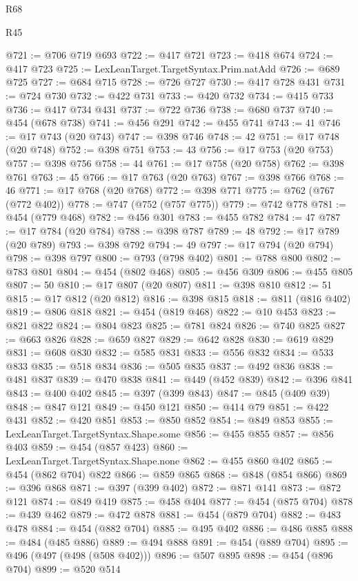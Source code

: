 \begin{lexlean}{R68}
\begin{lexlean}{R45}
\begin{coremodule}
{{{{{{{{{{{{{{{{{{{{{{{{{{{{{{{{{{{{{{{{{{{{{{{{{{{{{{{{{{{{{{{{{{{{{{{{{{{{{{{{{{{{{{{{{{{@721 := @706 @719 @693
@722 := @417 @721
@723 := @418 @674
@724 := @417 @723
@725 := LexLeanTarget.TargetSyntax.Prim.natAdd
@726 := @689 @725
@727 := @684 @715
@728 := @726 @727
@730 := @417 @728 @431
@731 := @724 @730
@732 := @422 @731
@733 := @420 @732
@734 := @415 @733
@736 := @417 @734 @431
@737 := @722 @736
@738 := @680 @737
@740 := @454 (@678 @738)
@741 := @456 @291
@742 := @455 @741
@743 := 41
@746 := @17 @743 (@20 @743)
@747 := @398 @746
@748 := 42
@751 := @17 @748 (@20 @748)
@752 := @398 @751
@753 := 43
@756 := @17 @753 (@20 @753)
@757 := @398 @756
@758 := 44
@761 := @17 @758 (@20 @758)
@762 := @398 @761
@763 := 45
@766 := @17 @763 (@20 @763)
@767 := @398 @766
@768 := 46
@771 := @17 @768 (@20 @768)
@772 := @398 @771
@775 := @762 (@767 (@772 @402))
@778 := @747 (@752 (@757 @775))
@779 := @742 @778
@781 := @454 (@779 @468)
@782 := @456 @301
@783 := @455 @782
@784 := 47
@787 := @17 @784 (@20 @784)
@788 := @398 @787
@789 := 48
@792 := @17 @789 (@20 @789)
@793 := @398 @792
@794 := 49
@797 := @17 @794 (@20 @794)
@798 := @398 @797
@800 := @793 (@798 @402)
@801 := @788 @800
@802 := @783 @801
@804 := @454 (@802 @468)
@805 := @456 @309
@806 := @455 @805
@807 := 50
@810 := @17 @807 (@20 @807)
@811 := @398 @810
@812 := 51
@815 := @17 @812 (@20 @812)
@816 := @398 @815
@818 := @811 (@816 @402)
@819 := @806 @818
@821 := @454 (@819 @468)
@822 := @10 @453
@823 := @821 @822
@824 := @804 @823
@825 := @781 @824
@826 := @740 @825
@827 := @663 @826
@828 := @659 @827
@829 := @642 @828
@830 := @619 @829
@831 := @608 @830
@832 := @585 @831
@833 := @556 @832
@834 := @533 @833
@835 := @518 @834
@836 := @505 @835
@837 := @492 @836
@838 := @481 @837
@839 := @470 @838
@841 := @449 (@452 @839)
@842 := @396 @841
@843 := @400 @402
@845 := @397 (@399 @843)
@847 := @845 (@409 @39)
@848 := @847 @121
@849 := @450 @121
@850 := @414 @79
@851 := @422 @431
@852 := @420 @851
@853 := @850 @852
@854 := @849 @853
@855 := LexLeanTarget.TargetSyntax.Shape.some
@856 := @455 @855
@857 := @856 @403
@859 := @454 (@857 @423)
@860 := LexLeanTarget.TargetSyntax.Shape.none
@862 := @455 @860 @402
@865 := @454 (@862 @704) @822
@866 := @859 @865
@868 := @848 (@854 @866)
@869 := @396 @868
@871 := @397 (@399 @402)
@872 := @871 @141
@873 := @872 @121
@874 := @849 @419
@875 := @458 @404
@877 := @454 (@875 @704)
@878 := @439 @462
@879 := @472 @878
@881 := @454 (@879 @704)
@882 := @483 @478
@884 := @454 (@882 @704)
@885 := @495 @402
@886 := @486 @885
@888 := @484 (@485 @886)
@889 := @494 @888
@891 := @454 (@889 @704)
@895 := @496 (@497 (@498 (@508 @402)))
@896 := @507 @895
@898 := @454 (@896 @704)
@899 := @520 @514
}}}}}}}}}}}}}}}}}}}}}}}}}}}}}}}}}}}}}}}}}}}}}}}}}}}}}}}}}}}}}}}}}}}}}}}}}}}}}}}}}}}}}}}}}}}
\end{coremodule}
\end{lexlean}
\end{lexlean}
